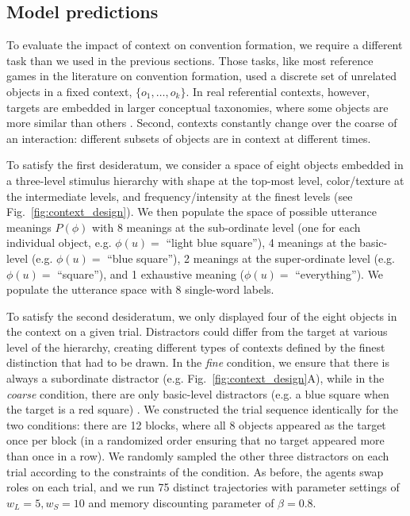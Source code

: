 \subsection{Model predictions}

To evaluate the impact of context on convention formation, we require a different task than we used in the previous sections.
Those tasks, like most reference games in the literature on convention formation, used a discrete set of unrelated objects in a fixed context, $\{o_1, \dots, o_k\}$. 
In real referential contexts, however, targets are embedded in larger conceptual taxonomies, where some objects are more similar than others \cite{bruner1956study,collins1969retrieval,XuTenenbaum07_WordLearningBayesian}.
Second, contexts constantly change over the coarse of an interaction: different subsets of objects are in context at different times.

To satisfy the first desideratum, we consider a space of eight objects embedded in a three-level stimulus hierarchy with shape at the top-most level, color/texture at the intermediate levels, and frequency/intensity at the finest levels (see Fig.~\ref{fig:context_design}). 
We then populate the space of possible utterance meanings $P(\phi)$ with 8 meanings at the sub-ordinate level (one for each individual object, e.g. $\phi(u) =$ ``light blue square''), 4 meanings at the basic-level (e.g. $\phi(u) =$ ``blue square''), 2 meanings at the super-ordinate level (e.g. $\phi(u) =$ ``square''), and 1 exhaustive meaning ($\phi(u) =$ ``everything''). %
We populate the utterance space with 8 single-word labels. 

To satisfy the second desideratum, we only displayed four of the eight objects in the context on a given trial.
Distractors could differ from the target at various level of the hierarchy, creating different types of contexts defined by the finest distinction that had to be drawn. 
In the \emph{fine} condition, we ensure that there is always a subordinate distractor (e.g. Fig.~\ref{fig:context_design}A), while in the \emph{coarse} condition, there are only basic-level distractors (e.g. a blue square when the target is a red square) .
We constructed the trial sequence identically for the two conditions: there are 12 blocks, where all 8 objects appeared as the target once per block (in a randomized order ensuring that no target appeared more than once in a row).
We randomly sampled the other three distractors on each trial according to the constraints of the condition.
As before, the agents swap roles on each trial, and we run 75 distinct trajectories with parameter settings of $w_L=5, w_S=10$ and memory discounting parameter of $\beta = 0.8$.%

